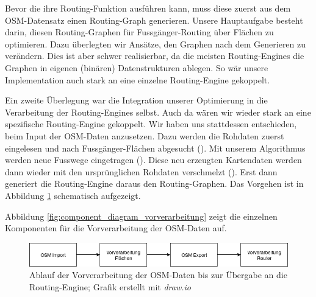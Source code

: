 Bevor die  ihre Routing-Funktion ausführen kann, muss diese zuerst aus dem \ac{OSM}-Datensatz einen Routing-Graph generieren. Unsere Hauptaufgabe besteht darin, diesen Routing-Graphen für Fussgänger-Routing über Flächen zu optimieren. Dazu überlegten wir Ansätze, den Graphen nach dem Generieren zu verändern. Dies ist aber schwer realisierbar, da die meisten Routing-Engines die Graphen in eigenen (binären) Datenstrukturen ablegen. So wär unsere Implementation auch stark an eine einzelne Routing-Engine gekoppelt.

Ein zweite Überlegung war die Integration unserer Optimierung in die Verarbeitung der Routing-Engines selbst. Auch da wären wir wieder stark an eine spezifische Routing-Engine gekoppelt.
Wir haben uns stattdessen entschieden, beim Input der \ac{OSM}-Daten anzusetzen. Dazu werden die Rohdaten zuerst eingelesen und nach Fussgänger-Flächen abgesucht (). Mit unserem Algorithmus werden neue Fusswege eingetragen (). Diese neu erzeugten Kartendaten werden dann wieder mit den ursprünglichen Rohdaten verschmelzt (). Erst dann generiert die Routing-Engine daraus den Routing-Graphen. Das Vorgehen ist in Abbildung \ref{fig:workflow_vorverarbeitung} schematisch aufgezeigt.

Abbildung \ref{fig:component_diagram_vorverarbeitung} zeigt die einzelnen Komponenten für die Vorverarbeitung der \ac{OSM}-Daten auf.


\begin{figure}[ht]
    \centering
    \includegraphics[width=1\linewidth]{projectdoc/img/workflow_vorverarbeitung.png}
    \caption[Ablauf Vorverarbeitung]{Ablauf der Vorverarbeitung der \ac{OSM}-Daten bis zur Übergabe an die Routing-Engine; Grafik erstellt mit \emph{draw.io}}
    \label{fig:workflow_vorverarbeitung}
\end{figure}
    

